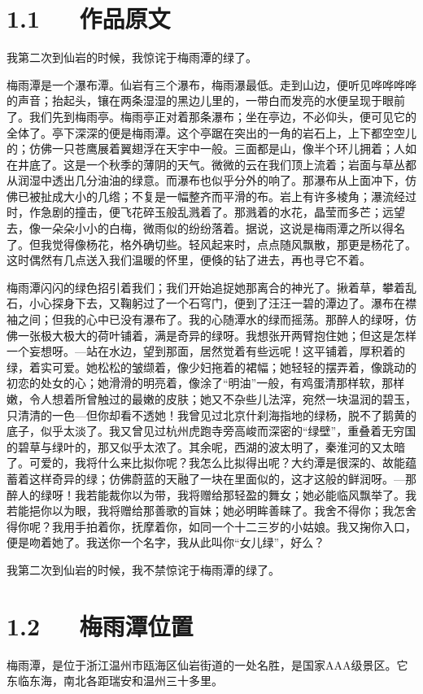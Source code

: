 \documentclass[letterpaper,10pt,english]{sphinxmanual}
\begin{document}
\section{1.1   作品原文}
\label{\detokenize{p01_u6563_u6587/_u6731_u81ea_u6e05-_u6885_u96e8_u6f6d_u7684_u7eff:id3}}
我第二次到仙岩的时候，我惊诧于梅雨潭的绿了。

梅雨潭是一个瀑布潭。仙岩有三个瀑布，梅雨瀑最低。走到山边，便听见哗哗哗哗的声音；抬起头，镶在两条湿湿的黑边儿里的，一带白而发亮的水便呈现于眼前了。我们先到梅雨亭。梅雨亭正对着那条瀑布；坐在亭边，不必仰头，便可见它的全体了。亭下深深的便是梅雨潭。这个亭踞在突出的一角的岩石上，上下都空空儿的；仿佛一只苍鹰展着翼翅浮在天宇中一般。三面都是山，像半个环儿拥着；人如在井底了。这是一个秋季的薄阴的天气。微微的云在我们顶上流着；岩面与草丛都从润湿中透出几分油油的绿意。而瀑布也似乎分外的响了。那瀑布从上面冲下，仿佛已被扯成大小的几绺；不复是一幅整齐而平滑的布。岩上有许多棱角；瀑流经过时，作急剧的撞击，便飞花碎玉般乱溅着了。那溅着的水花，晶莹而多芒；远望去，像一朵朵小小的白梅，微雨似的纷纷落着。据说，这说是梅雨潭之所以得名了。但我觉得像杨花，格外确切些。轻风起来时，点点随风飘散，那更是杨花了。这时偶然有几点送入我们温暖的怀里，便倏的钻了进去，再也寻它不着。

梅雨潭闪闪的绿色招引着我们；我们开始追捉她那离合的神光了。揪着草，攀着乱石，小心探身下去，又鞠躬过了一个石穹门，便到了汪汪一碧的潭边了。瀑布在襟袖之间；但我的心中已没有瀑布了。我的心随潭水的绿而摇荡。那醉人的绿呀，仿佛一张极大极大的荷叶铺着，满是奇异的绿呀。我想张开两臂抱住她；但这是怎样一个妄想呀。—站在水边，望到那面，居然觉着有些远呢！这平铺着，厚积着的绿，着实可爱。她松松的皱缬着，像少妇拖着的裙幅；她轻轻的摆弄着，像跳动的初恋的处女的心；她滑滑的明亮着，像涂了“明油”一般，有鸡蛋清那样软，那样嫩，令人想着所曾触过的最嫩的皮肤；她又不杂些儿法滓，宛然一块温润的碧玉，只清清的一色—但你却看不透她！我曾见过北京什刹海指地的绿杨，脱不了鹅黄的底子，似乎太淡了。我又曾见过杭州虎跑寺旁高峻而深密的“绿壁”，重叠着无穷国的碧草与绿叶的，那又似乎太浓了。其余呢，西湖的波太明了，秦淮河的又太暗了。可爱的，我将什么来比拟你呢？我怎么比拟得出呢？大约潭是很深的、故能蕴蓄着这样奇异的绿；仿佛蔚蓝的天融了一块在里面似的，这才这般的鲜润呀。—那醉人的绿呀！我若能裁你以为带，我将赠给那轻盈的舞女；她必能临风飘举了。我若能挹你以为眼，我将赠给那善歌的盲妹；她必明眸善睐了。我舍不得你；我怎舍得你呢？我用手拍着你，抚摩着你，如同一个十二三岁的小姑娘。我又掬你入口，便是吻着她了。我送你一个名字，我从此叫你“女儿绿”，好么？

我第二次到仙岩的时候，我不禁惊诧于梅雨潭的绿了。


\section{1.2   梅雨潭位置}
\label{\detokenize{p01_u6563_u6587/_u6731_u81ea_u6e05-_u6885_u96e8_u6f6d_u7684_u7eff:id4}}
梅雨潭，是位于浙江温州市瓯海区仙岩街道的一处名胜，是国家AAA级景区。它东临东海，南北各距瑞安和温州三十多里。
\end{document}
